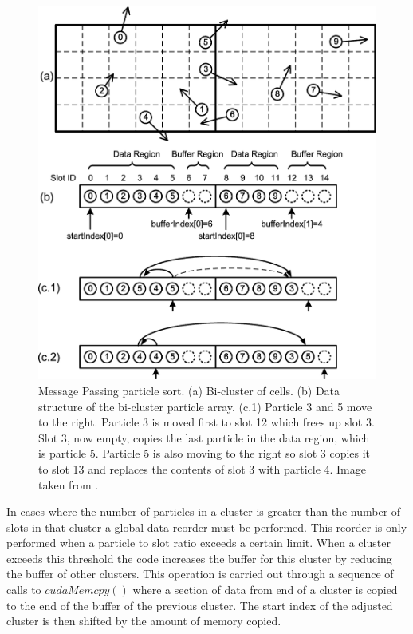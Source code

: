\begin{figure}
\begin{center}
\includegraphics[width=5in]{design/kong_sort.png}
\end{center}
\caption[Message Passing Particle Sort]{Message Passing particle sort. (a) Bi-cluster of cells. (b) Data structure of the bi-cluster particle array. (c.1) Particle 3 and 5 move to the right. Particle 3 is moved first to slot 12 which frees up slot 3. Slot 3, now empty, copies the last particle in the data region, which is particle 5. Particle 5 is also moving to the right so slot 3 copies it to slot 13 and replaces the contents of slot 3 with particle 4. Image taken from \cite{Kong2011}.}
\label{fig:kong_sort}
\end{figure}

	In cases where the number of particles in a cluster is greater than the number of slots in that cluster a global data reorder must be performed. This reorder is only performed when a particle to slot ratio exceeds a certain limit. When a cluster exceeds this threshold the code increases the buffer for this cluster by reducing the buffer of other clusters. This operation is carried out through a sequence of calls to $cudaMemcpy()$ where a section of data from end of a cluster is copied to the end of the buffer of the previous cluster. The start index of the adjusted cluster is then shifted by the amount of memory copied. \cite{Kong2011}

